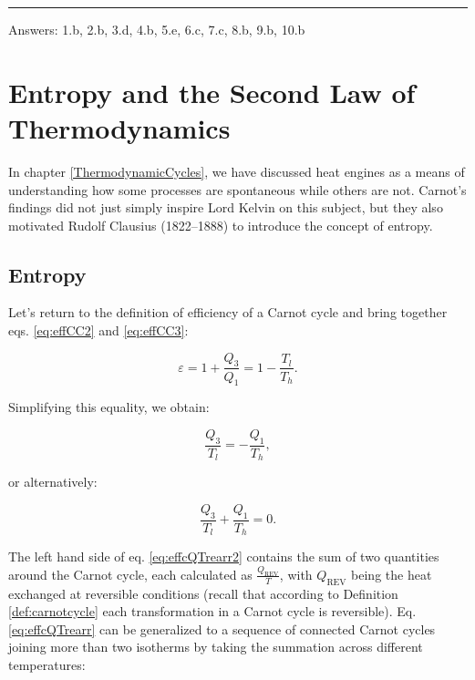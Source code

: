 \documentclass[
  9pt,
]{extbook}
\theoremstyle{definition}
\theoremstyle{definition}
\theoremstyle{definition}
\theoremstyle{definition}
\theoremstyle{remark}
\begin{document}
\begin{center}\rule{0.5\linewidth}{0.5pt}\end{center}

Answers: 1.b, 2.b, 3.d, 4.b, 5.e, 6.c, 7.c, 8.b, 9.b, 10.b

\chapter{Entropy and the Second Law of Thermodynamics}\label{SecondLaw}

In chapter \ref{ThermodynamicCycles}, we have discussed heat engines as a means of understanding how some processes are spontaneous while others are not. Carnot's findings did not just simply inspire Lord Kelvin on this subject, but they also motivated Rudolf Clausius (1822--1888) to introduce the concept of entropy.

\section{Entropy}\label{entropyint}

Let's return to the definition of efficiency of a Carnot cycle and bring together eqs. \eqref{eq:effCC2} and \eqref{eq:effCC3}:

\begin{equation}
\varepsilon = 1+\frac{Q_3}{Q_1} = 1-\frac{T_l}{T_h}.
\label{eq:effcQT}
\end{equation}

Simplifying this equality, we obtain:

\begin{equation}
\frac{Q_3}{T_l} = -\frac{Q_1}{T_h},
\label{eq:effcQTrearr}
\end{equation}

or alternatively:

\begin{equation}
\frac{Q_3}{T_l} + \frac{Q_1}{T_h} = 0.
\label{eq:effcQTrearr2}
\end{equation}

The left hand side of eq. \eqref{eq:effcQTrearr2} contains the sum of two quantities around the Carnot cycle, each calculated as \(\frac{Q_{\mathrm{REV}}}{T}\), with \(Q_{\mathrm{REV}}\) being the heat exchanged at reversible conditions (recall that according to Definition \ref{def:carnotcycle} each transformation in a Carnot cycle is reversible). Eq. \eqref{eq:effcQTrearr} can be generalized to a sequence of connected Carnot cycles joining more than two isotherms by taking the summation across different temperatures:
\end{document}
